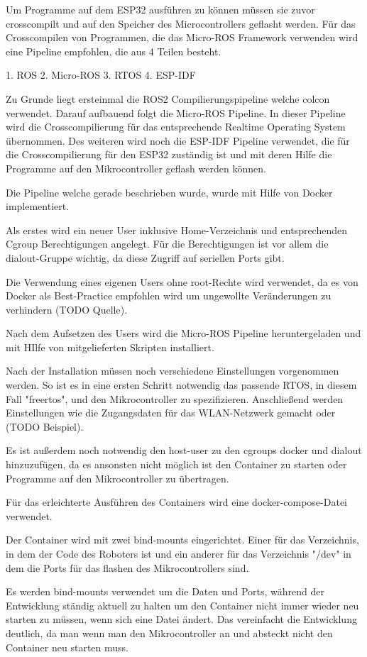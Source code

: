 \begin{flushleft}


    Um Programme auf dem ESP32 ausführen zu können müssen sie zuvor crosscompilt und auf den Speicher des Microcontrollers geflasht werden.
    Für das Crosscompilen von Programmen, die das Micro-ROS Framework verwenden wird eine Pipeline empfohlen, die aus 4 Teilen besteht.

    1. ROS
    2. Micro-ROS
    3. RTOS
    4. ESP-IDF

    Zu Grunde liegt ersteinmal die ROS2 Compilierungspipeline welche colcon verwendet.
    Darauf aufbauend folgt die Micro-ROS Pipeline. In dieser Pipeline wird die Crosscompilierung für das entsprechende Realtime Operating System übernommen.
    Des weiteren wird noch die ESP-IDF Pipeline verwendet, die für die Crosscompilierung für den ESP32 zuständig ist und mit deren Hilfe die Programme auf den Mikrocontroller geflash werden können.

    Die Pipeline welche gerade beschrieben wurde, wurde mit Hilfe von Docker implementiert.

    Als erstes wird ein neuer User inklusive Home-Verzeichnis und entsprechenden Cgroup Berechtigungen angelegt.
    Für die Berechtigungen ist vor allem die dialout-Gruppe wichtig, da diese Zugriff auf seriellen Ports gibt.

    Die Verwendung eines eigenen Users ohne root-Rechte wird verwendet, 
    da es von Docker als Best-Practice empfohlen wird um ungewollte Veränderungen zu verhindern (TODO Quelle).


    Nach dem Aufsetzen des Users wird die Micro-ROS Pipeline heruntergeladen und mit HIlfe von mitgelieferten Skripten installiert.

    Nach der Installation müssen noch verschiedene Einstellungen vorgenommen werden. So ist es in eine ersten Schritt notwendig das passende RTOS, in diesem Fall "freertos",
    und den Mikrocontroller zu spezifizieren. Anschließend werden Einstellungen wie die Zugangsdaten für das WLAN-Netzwerk gemacht oder (TODO Beispiel).

    Es ist außerdem noch notwendig den host-user zu den cgroups docker und dialout hinzuzufügen, 
    da es ansonsten nicht möglich ist den Container zu starten oder Programme auf den Mikrocontroller zu übertragen.


    Für das erleichterte Ausführen des Containers wird eine docker-compose-Datei verwendet.

    Der Container wird mit zwei bind-mounts eingerichtet. Einer für das Verzeichnis, 
    in dem der Code des Roboters ist und ein anderer für das Verzeichnis "/dev" in dem die Ports für das flashen des Mikrocontrollers sind.

    Es werden bind-mounts verwendet um die Daten und Ports, während der Entwicklung ständig aktuell zu halten um den Container nicht immer wieder neu starten zu müssen, wenn sich eine Datei ändert.
    Das vereinfacht die Entwicklung deutlich, da man wenn man den Mikrocontroller an und absteckt nicht den Container neu starten muss.
    
\end{flushleft}